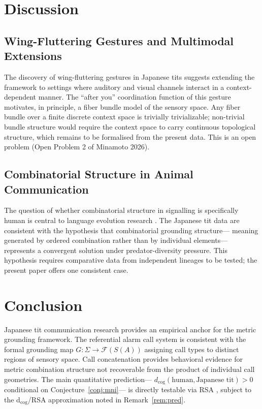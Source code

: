 \documentclass[12pt]{article}
\begin{document}
\section{Discussion}

\subsection{Wing-Fluttering Gestures and Multimodal Extensions}

The discovery of wing-fluttering gestures in Japanese tits \citep{suzuki2024}
suggests extending the framework to settings where
auditory and visual channels interact in a context-dependent manner.
The ``after you'' coordination function of this gesture
motivates, in principle, a fiber bundle model of the sensory space.
Any fiber bundle over a finite discrete context space
is trivially trivializable; non-trivial bundle structure
would require the context space to carry continuous topological structure,
which remains to be formalised from the present data.
This is an open problem (Open Problem 2 of Minamoto 2026).

\subsection{Combinatorial Structure in Animal Communication}

The question of whether combinatorial structure in signalling
is specifically human is central to language evolution research
\citep{hockett1960,hauser2002}.
The Japanese tit data are consistent with the hypothesis
that combinatorial grounding structure---
meaning generated by ordered combination
rather than by individual elements---
represents a convergent solution under predator-diversity pressure.
This hypothesis requires comparative data from independent lineages
to be tested; the present paper offers one consistent case.

\section{Conclusion}

Japanese tit communication research provides
an empirical anchor for the metric grounding framework.
The referential alarm call system \citep{suzuki2012,suzuki2016mob}
is consistent with the formal grounding map $G: \Sigma \to \mathcal{F}(S(A))$
assigning call types to distinct regions of sensory space.
Call concatenation \citep{suzuki2016syn,suzuki2017ord}
provides behavioral evidence for metric combination structure
not recoverable from the product of individual call geometries.
The main quantitative prediction---
$d_\mathrm{cog}(\text{human}, \text{Japanese tit}) > 0$
conditional on Conjecture~\ref{conj:mni}---
is directly testable via RSA \citep{kriegeskorte2008},
subject to the d$_\mathrm{cog}$/RSA approximation noted in
Remark~\ref{rem:pred}.
\end{document}
